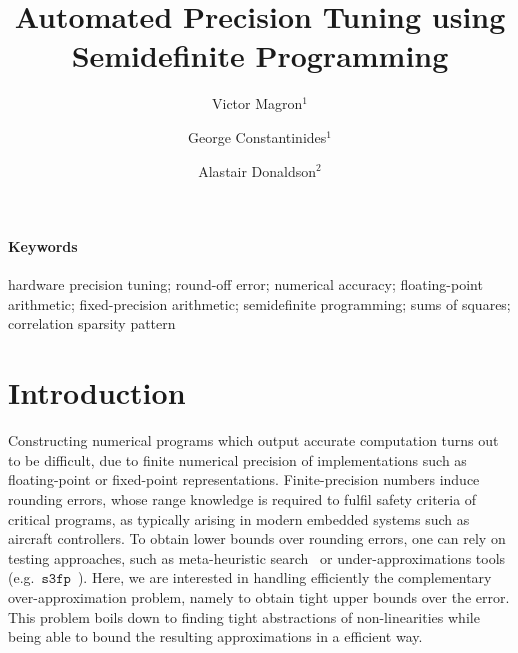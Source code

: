 \documentclass[a4paper,10pt]{article}
\title{\bf Automated Precision Tuning using Semidefinite Programming}
\newcommand{\sthreefp}{\mathtt{s3fp}}
\theoremstyle{plain}
\theoremstyle{definition}
\theoremstyle{remark}
\begin{document}
\author{Victor Magron$^{1}$ \and George Constantinides$^{1}$ \and Alastair Donaldson$^{2}$}


\maketitle

\begin{abstract}
\end{abstract}
\paragraph{Keywords}
hardware precision tuning; round-off error; numerical accuracy; floating-point arithmetic; fixed-precision arithmetic; semidefinite programming; sums of squares; correlation sparsity pattern
\section{Introduction} %
\label{sec:intro}
%
Constructing numerical programs which output accurate computation turns out to be difficult, due to finite numerical precision of implementations such as floating-point or fixed-point representations. Finite-precision numbers induce rounding errors, whose range knowledge is required to fulfil safety criteria of critical programs, as typically arising in modern embedded systems such as aircraft controllers.
To obtain lower bounds over rounding errors, one can rely on testing approaches, such as meta-heuristic search~\cite{Borges12Test} or under-approximations tools (e.g.~$\sthreefp$~\cite{Chiang14s3fp}). Here, we are interested in handling efficiently the complementary over-approximation problem, namely to obtain tight upper bounds over the error. This problem boils down to finding tight abstractions of non-linearities while being able to bound the resulting approximations in a efficient way.  
%
\end{document}
